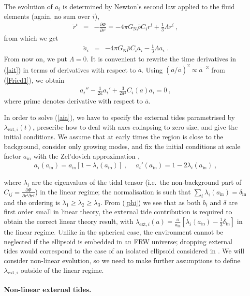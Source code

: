 \documentclass[11pt, a4paper]{article}
\newcommand{\bea}{\begin{eqnarray}} \newcommand{\eea}{\end{eqnarray}}
\newcommand{\re}[1]{(\ref{#1})}
\newcommand{\pat}{\partial}
\newcommand{\para}{\paragraph}
\renewcommand{\l}{\lambda}
\newcommand{\GN}{G_{\mathrm{N}}}
\newcommand{\ie}{i.e.\ }
\newcommand{\addot}{\ddot{a}}
\newcommand{\rhob}{\bar{\rho}}
\renewcommand{\in}{\textrm{in}}
\newcommand{\lei}{\l_{\mathrm{ext},i}}
\begin{document}
The evolution of $a_i$ is determined by Newton's second law applied to the fluid elements (again, no sum over $i$),
\bea
  \ddot r^i &=& - \frac{\pat \Phi}{\pat r^i} = - 4\pi\GN \rhob C_i r^i + \frac{1}{3} \Lambda r^i\ ,
\eea
%
from which we get
\bea \label{ait}
  \addot_i &=& - 4\pi\GN \rhob C_i a_i - \frac{1}{3} \Lambda a_i \ .
\eea
%
From now on, we put $\Lambda=0$. It is convenient to rewrite the time derivatives in \re{ait} in terms of derivatives with respect to $\bar a$. Using $(\dot{\bar{a}}/\bar a)^2\propto\bar{a}^{-3}$ from \re{Fried1}, we obtain
\bea \label{aia}
  a_i'' - \frac{1}{2 a} a_i' + \frac{3}{2 a^2} C_i(a) a_i = 0 \ ,
\eea
%
where prime denotes derivative with respect to $\bar a$.

In order to solve \re{aia}, we have to specify the external tides parametrised by $\lei(t)$, prescribe how to deal with axes collapsing to zero size, and give the initial conditions. We assume that at early times the region is close to the background, consider only growing modes, and fix the initial conditions at scale factor $a_\in$ with the Zel'dovich approximation \cite{Zeldovich:1970},
\bea \label{aiin}
  a_i(a_\in) = a_\in [ 1 - \l_i(a_\in) ] \ , \quad \ a_i'(a_\in) = 1 - 2 \l_i(a_\in) \ ,
\eea

\noindent where $\l_i$ are the eigenvalues of the tidal tensor (\ie the non-background part of $C_{ij}=\frac{\pat\Phi}{\pat r^i \pat r^j}$) in the linear regime; the normalisation is such that $\sum_i\l_i(a_\in)=\delta_\in$ and the ordering is $\l_1\geq\l_2\geq\l_3$. From \re{phi} we see that as both $b_i$ and $\delta$ are first order small in linear theory, the external tide contribution is required to obtain the correct linear theory result, with $\lei(a)=\frac{a}{a_\in} [\l_i(a_\in)-\frac{1}{3}\delta_\in]$ in the linear regime. Unlike in the spherical case, the environment cannot be neglected if the ellipsoid is embedded in an FRW universe; dropping external tides would correspond to the case of an isolated ellipsoid considered in \cite{Peebles:1980}.
We will consider non-linear evolution, so we need to make further assumptions to define $\lei$ outside of the linear regime.

\para{Non-linear external tides.}
\end{document}
